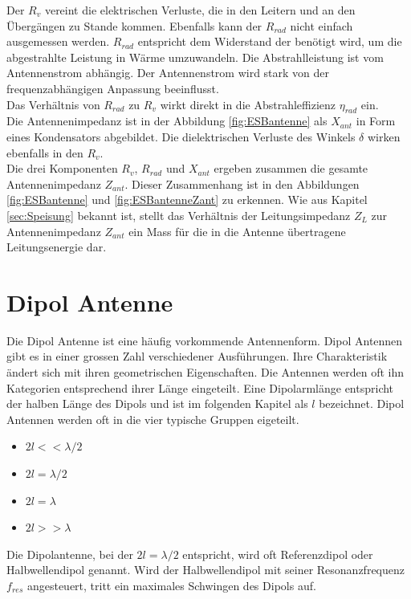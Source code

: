 \newpage
Der $R_{v}$ vereint die elektrischen Verluste, die in den Leitern und an den Übergängen zu Stande kommen. Ebenfalls kann der $R_{rad}$ nicht einfach ausgemessen werden. $R_{rad}$ entspricht dem Widerstand der benötigt wird, um  die abgestrahlte Leistung in Wärme umzuwandeln. Die Abstrahlleistung ist vom Antennenstrom abhängig. Der Antennenstrom wird stark von der frequenzabhängigen Anpassung beeinflusst.\\
Das Verhältnis von $R_{rad}$  zu $R_{v}$ wirkt direkt in die Abstrahleffizienz $\eta_{rad}$ ein. \\
Die Antennenimpedanz ist in der Abbildung \ref{fig:ESBantenne} als $X_{ant}$ in Form eines Kondensators abgebildet. Die dielektrischen Verluste des Winkels $\delta$ wirken ebenfalls in den $R_{v}$.\\
Die drei Komponenten $R_{v}$, $R_{rad}$ und $X_{ant}$ ergeben zusammen die gesamte Antennenimpedanz $Z_{ant}$. Dieser Zusammenhang ist  in den Abbildungen \ref{fig:ESBantenne} und \ref{fig:ESBantenneZant} zu erkennen. Wie aus Kapitel \ref{sec:Speisung} bekannt ist, stellt das Verhältnis der Leitungsimpedanz $Z_L$ zur Antennenimpedanz $Z_{ant}$ ein Mass für die in die Antenne übertragene Leitungsenergie dar.


\section{Dipol Antenne}
Die Dipol Antenne ist eine häufig vorkommende Antennenform.  Dipol Antennen gibt es in einer grossen Zahl verschiedener Ausführungen. Ihre Charakteristik ändert sich mit ihren geometrischen Eigenschaften. Die Antennen werden oft ihn Kategorien entsprechend ihrer Länge eingeteilt. Eine Dipolarmlänge entspricht der halben Länge des Dipols und ist im folgenden Kapitel als $l$ bezeichnet. Dipol Antennen werden oft in die  vier typische Gruppen eigeteilt. 
\begin{itemize}
\item $2l<< \lambda/2 $
\item $2l = \lambda/2 $
\item $2l = \lambda $
\item $2l>> \lambda $
\end{itemize} 
Die Dipolantenne, bei der $2l=\lambda/2$ entspricht, wird oft Referenzdipol oder Halbwellendipol genannt. Wird der Halbwellendipol mit seiner Resonanzfrequenz $f_{res}$ angesteuert, tritt ein maximales Schwingen des Dipols auf. 


